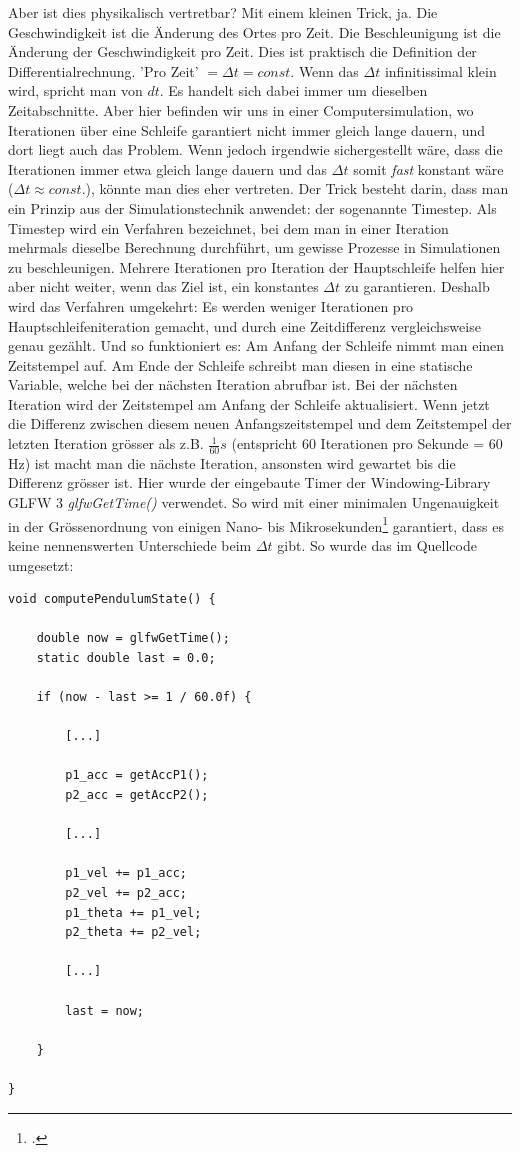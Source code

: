 \documentclass[titlepage, 11pt, a4paper, ngerman]{article}
\begin{document}
Aber ist dies physikalisch vertretbar? Mit einem kleinen Trick, ja. Die Geschwindigkeit ist die Änderung des Ortes pro Zeit. Die Beschleunigung ist die Änderung der Geschwindigkeit pro Zeit. Dies ist praktisch die Definition der Differentialrechnung. 'Pro Zeit' $ = \Delta t = const.$ Wenn das $\Delta t$ infinitissimal klein wird, spricht man von $dt$. Es handelt sich dabei immer um dieselben Zeitabschnitte. Aber hier befinden wir uns in einer Computersimulation, wo Iterationen über eine Schleife garantiert nicht immer gleich lange dauern, und dort liegt auch das Problem. Wenn jedoch irgendwie sichergestellt wäre, dass die Iterationen immer etwa gleich lange dauern und das $\Delta t$ somit \textit{fast} konstant wäre ($\Delta t \approx const.$), könnte man dies eher vertreten. Der Trick besteht darin, dass man ein Prinzip aus der Simulationstechnik anwendet: der sogenannte Timestep. Als Timestep wird ein Verfahren bezeichnet, bei dem man in einer Iteration mehrmals dieselbe Berechnung durchführt, um gewisse Prozesse in Simulationen zu beschleunigen. Mehrere Iterationen pro Iteration der Hauptschleife helfen hier aber nicht weiter, wenn das Ziel ist, ein konstantes $\Delta t$ zu garantieren. Deshalb wird das Verfahren umgekehrt: Es werden weniger Iterationen pro Hauptschleifeniteration gemacht, und durch eine Zeitdifferenz vergleichsweise genau gezählt. Und so funktioniert es: Am Anfang der Schleife nimmt man einen Zeitstempel auf. Am Ende der Schleife schreibt man diesen in eine statische Variable, welche bei der nächsten Iteration abrufbar ist. Bei der nächsten Iteration wird der Zeitstempel am Anfang der Schleife aktualisiert. Wenn jetzt die Differenz zwischen diesem neuen Anfangszeitstempel und dem Zeitstempel der letzten Iteration grösser als z.B. $\frac{1}{60} s$ (entspricht 60 Iterationen pro Sekunde = 60 Hz) ist macht man die nächste Iteration, ansonsten wird gewartet bis die Differenz grösser ist. Hier wurde der eingebaute Timer der Windowing-Library \acrshort{GLFW} 3 \textit{glfwGetTime()} verwendet. So wird mit einer minimalen Ungenauigkeit in der Grössenordnung von einigen Nano- bis Mikrosekunden\footcite{glfwGetTimeDoc} garantiert, dass es keine nennenswerten Unterschiede beim $\Delta t$ gibt. So wurde das im Quellcode umgesetzt:
\begin{verbatim}
void computePendulumState() {

    double now = glfwGetTime();
    static double last = 0.0;

    if (now - last >= 1 / 60.0f) {

        [...]

        p1_acc = getAccP1();
        p2_acc = getAccP2();

        [...]

        p1_vel += p1_acc;
        p2_vel += p2_acc;
        p1_theta += p1_vel;
        p2_theta += p2_vel;
        
        [...]
        
        last = now;

    }

}
\end{verbatim}
\end{document}
